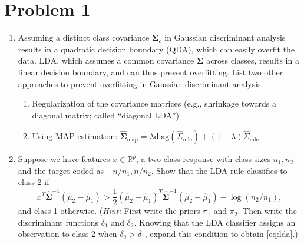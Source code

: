 \documentclass[11pt,twoside]{article}
\newcommand{\pts}[1]{\marginpar{ \small\hspace{0pt} \textit{[#1]} } }
\newcommand{\?}{\stackrel{?}{=}}
\newcommand{\fr}{\frac}
\newcommand{\bl}{\color{blue!80!black}}
\newenvironment{solution}
{\medskip\par\begin{adjustwidth}{.01\textwidth}{.01\textwidth}\bl}{\medskip\end{adjustwidth}}
\begin{document}
\section*{Problem 1 }
\begin{enumerate}[\bf (a)]
 \item Assuming a distinct class covariance $\bm\Sigma_c$ in Gaussian discriminant analysis results in a quadratic  \pts{2} decision boundary (QDA), which can easily overfit the data. LDA, which assumes a common covariance $\bm\Sigma$ across classes, results in a linear decision boundary, and can thus prevent overfitting. List two other approaches to prevent overfitting in Gaussian discriminant analysis. 
 \begin{solution}
  \begin{enumerate}[\bf (i)]
    \item Regularization of the covariance matrices (e.g., shrinkage towards a diagonal matrix; called ``diagonal LDA'')
    \item Using MAP estimation: $\bm \hat{\Sigma}_{\text{map}} = \lambda \text{diag}(\hat{\Sigma}_{\text{mle}}) + (1-\lambda)\hat{\Sigma}_{\text{mle}}$
  \end{enumerate}
 \end{solution}
\item Suppose we have features \pts{8} $x \in \mathbb{R}^p$, a two-class response with class sizes $n_1, n_2$ and the
  target coded as $-n/n_1, n/n_2$.  Show that the LDA rule classifies to class 2 if
  \begin{equation}
    \label{eq:lda}
    x^T \hat{\bm{\Sigma}}^{-1}(\hat\mu_2 - \hat\mu_1) > \fr12(\hat\mu_2 + \hat\mu_1)^T\hat{\bm{\Sigma}}^{-1}(\hat\mu_2 - \hat\mu_1) - \log(n_2/n_1),
  \end{equation}
  and class 1 otherwise. (\textit{Hint:} First write the priors $\pi_{1}$ and $\pi_{2}$. Then write the discriminant
  functions $\delta_{1}$ and $\delta_{2}$. Knowing that the LDA classifier assigns an observation to class 2 when
  $\delta_{2} > \delta_{1}$, expand this condition to obtain \eqref{eq:lda}.)


\end{enumerate}
\end{document}
